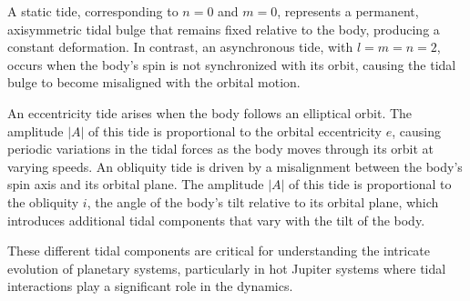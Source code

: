 \documentclass[oneside,12pt]{amsart}
\numberwithin{page}{section}
\begin{document}
A static tide, corresponding to $n=0$ and $m=0$, represents a permanent, axisymmetric tidal bulge that remains fixed relative to the body, producing a constant deformation. In contrast, an asynchronous tide, with $l=m=n=2$, occurs when the body’s spin is not synchronized with its orbit, causing the tidal bulge to become misaligned with the orbital motion.

An eccentricity tide arises when the body follows an elliptical orbit. The amplitude $|A|$ of this tide is proportional to the orbital eccentricity $e$, causing periodic variations in the tidal forces as the body moves through its orbit at varying speeds. An obliquity tide is driven by a misalignment between the body’s spin axis and its orbital plane. The amplitude $|A|$ of this tide is proportional to the obliquity $i$, the angle of the body's tilt relative to its orbital plane, which introduces additional tidal components that vary with the tilt of the body.

These different tidal components are critical for understanding the intricate evolution of planetary systems, particularly in hot Jupiter systems where tidal interactions play a significant role in the dynamics.
\end{document}
